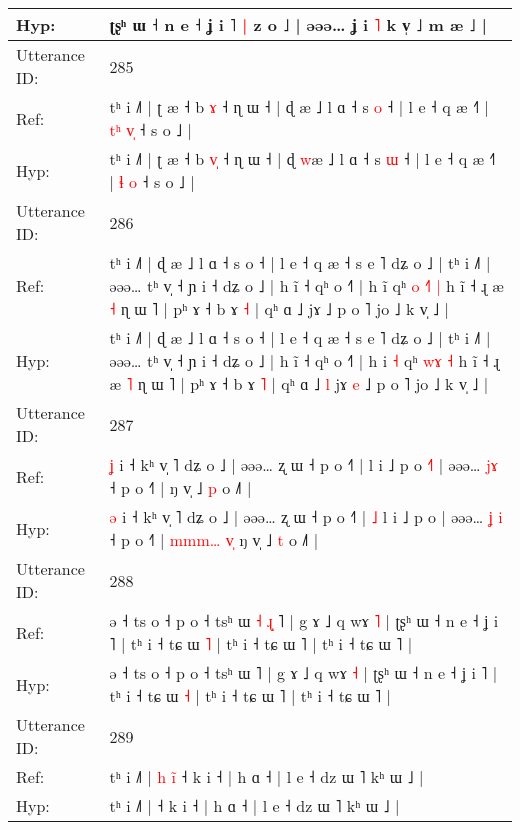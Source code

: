 \documentclass[10pt]{article}
\DeclareRobustCommand{\hl}[1]{{\textcolor{red}{#1}}}
\begin{document}
\begin{longtable}{ll}
 \\
Hyp: & ʈʂʰ ɯ ˧ n e ˧ ʝ i ˥\hl{ }\hl{|} z o ˩ | əəə… ʝ i \hl{˥} k v̩ ˩ m æ ˩ |
 \\
\midrule
Utterance ID: & 285 \\
Ref: & tʰ i ˩˥ | ʈ æ ˧ b \hl{}\hl{ɤ} ˧ ɳ ɯ ˧ | ɖ \hl{}æ ˩ l ɑ ˧ s \hl{o} ˧ | l e ˧ q æ ˧˥ | \hl{t}\hl{ʰ} \hl{v}\hl{̩} ˧ s o ˩ |
 \\
Hyp: & tʰ i ˩˥ | ʈ æ ˧ b \hl{v}\hl{̩} ˧ ɳ ɯ ˧ | ɖ \hl{w}æ ˩ l ɑ ˧ s \hl{ɯ} ˧ | l e ˧ q æ ˧˥ | \hl{}\hl{ɬ} \hl{}\hl{o} ˧ s o ˩ |
 \\
\midrule
Utterance ID: & 286 \\
Ref: & tʰ i ˩˥ | ɖ æ ˩ l ɑ ˧ s o ˧ | l e ˧ q æ ˧ s e ˥ dʑ o ˩ | tʰ i ˩˥ | əəə… tʰ v̩ ˧ ɲ i ˧ dʑ o ˩ | h ĩ ˧ qʰ o ˧˥ | h i\hl{}\hl{̃} qʰ\hl{ }\hl{o} \hl{˧}\hl{˥} \hl{|} h ĩ ˧ ɻ æ \hl{˧} ɳ ɯ ˥ | pʰ ɤ ˧ b ɤ \hl{˧} | qʰ ɑ ˩\hl{}\hl{} jɤ\hl{}\hl{} ˩ p o ˥ jo ˩ k v̩ ˩ |
 \\
Hyp: & tʰ i ˩˥ | ɖ æ ˩ l ɑ ˧ s o ˧ | l e ˧ q æ ˧ s e ˥ dʑ o ˩ | tʰ i ˩˥ | əəə… tʰ v̩ ˧ ɲ i ˧ dʑ o ˩ | h ĩ ˧ qʰ o ˧˥ | h i\hl{ }\hl{˧} qʰ\hl{}\hl{} \hl{w}\hl{ɤ} \hl{˧} h ĩ ˧ ɻ æ \hl{˥} ɳ ɯ ˥ | pʰ ɤ ˧ b ɤ \hl{˥} | qʰ ɑ ˩\hl{ }\hl{l} jɤ\hl{ }\hl{e} ˩ p o ˥ jo ˩ k v̩ ˩ |
 \\
\midrule
Utterance ID: & 287 \\
Ref: & \hl{ʝ} i ˧ kʰ v̩ ˥ dʑ o ˩ | əəə… ʐ ɯ ˧ p o ˧˥ |\hl{}\hl{} l i ˩ p o\hl{ }\hl{˧}\hl{˥} | əəə… \hl{}\hl{j}\hl{ɤ} ˧ p o ˧˥ |\hl{}\hl{}\hl{}\hl{}\hl{}\hl{}\hl{}\hl{} ŋ v̩ ˩ \hl{p} o ˩˥ |
 \\
Hyp: & \hl{ə} i ˧ kʰ v̩ ˥ dʑ o ˩ | əəə… ʐ ɯ ˧ p o ˧˥ |\hl{ }\hl{˩} l i ˩ p o\hl{}\hl{}\hl{} | əəə… \hl{ʝ}\hl{ }\hl{i} ˧ p o ˧˥ |\hl{ }\hl{m}\hl{m}\hl{m}\hl{…}\hl{ }\hl{v}\hl{̩} ŋ v̩ ˩ \hl{t} o ˩˥ |
 \\
\midrule
Utterance ID: & 288 \\
Ref: & ə ˧ ts o ˧ p o ˧ tsʰ ɯ\hl{ }\hl{˧}\hl{ }\hl{ɻ}\hl{̩} ˥ | g ɤ ˩ q wɤ \hl{˥} | ʈʂʰ ɯ ˧ n e ˧ ʝ i ˥ | tʰ i ˧ tɕ ɯ \hl{˥} | tʰ i ˧ tɕ ɯ ˥ | tʰ i ˧ tɕ ɯ ˥ |
 \\
Hyp: & ə ˧ ts o ˧ p o ˧ tsʰ ɯ\hl{}\hl{}\hl{}\hl{}\hl{} ˥ | g ɤ ˩ q wɤ \hl{˧} | ʈʂʰ ɯ ˧ n e ˧ ʝ i ˥ | tʰ i ˧ tɕ ɯ \hl{˧} | tʰ i ˧ tɕ ɯ ˥ | tʰ i ˧ tɕ ɯ ˥ |
 \\
\midrule
Utterance ID: & 289 \\
Ref: & tʰ i ˩˥ |\hl{ }\hl{h}\hl{ }\hl{i}\hl{̃} ˧ k i ˧ | h ɑ ˧ | l e ˧ dz ɯ ˥ kʰ ɯ ˩ |
 \\
Hyp: & tʰ i ˩˥ |\hl{}\hl{}\hl{}\hl{}\hl{} ˧ k i ˧ | h ɑ ˧ | l e ˧ dz ɯ ˥ kʰ ɯ ˩ |
 \\

\end{longtable}
\end{document}
